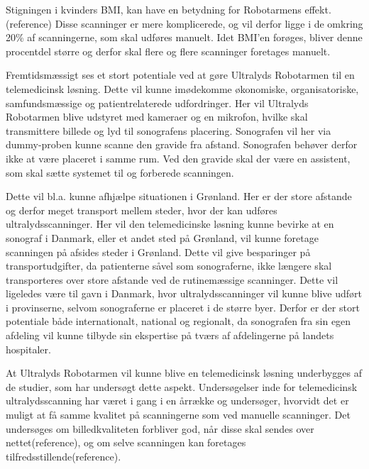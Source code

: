 Stigningen i kvinders BMI, kan have en betydning for Robotarmens effekt. (reference) Disse scanninger er mere komplicerede, og vil derfor ligge i de omkring 20\% af scanningerne, som skal udføres manuelt. Idet BMI’en forøges, bliver denne procentdel større og derfor skal flere og flere scanninger foretages manuelt. 

Fremtidsmæssigt ses et stort potentiale ved at gøre Ultralyds Robotarmen til en telemedicinsk løsning. Dette vil kunne imødekomme økonomiske, organisatoriske, samfundsmæssige og patientrelaterede
udfordringer. Her vil Ultralyds Robotarmen blive udstyret med kameraer og en mikrofon, hvilke skal transmittere billede og lyd til sonografens placering. Sonografen vil her via dummy-proben kunne scanne den gravide fra afstand. Sonografen behøver derfor ikke at være placeret i samme rum. Ved den gravide skal der være en assistent, som skal sætte systemet til og forberede scanningen.
 
Dette vil bl.a. kunne afhjælpe situationen i Grønland. Her er der store afstande og derfor meget transport mellem steder, hvor der kan udføres ultralydsscanninger. Her vil den telemedicinske løsning kunne bevirke at en sonograf i Danmark, eller et andet sted på Grønland, vil kunne foretage scanningen på afsides steder i Grønland. Dette vil give besparinger på transportudgifter, da patienterne såvel som sonograferne, ikke længere skal transporteres over store afstande ved de rutinemæssige scanninger. 
Dette vil ligeledes være til gavn i Danmark, hvor ultralydsscanninger vil kunne blive udført i provinserne, selvom sonograferne er placeret i de større byer.
Derfor er der stort potentiale både internationalt, national og regionalt, da sonografen fra sin egen afdeling vil kunne tilbyde sin ekspertise på tværs af afdelingerne på landets hospitaler. 

At Ultralyds Robotarmen vil kunne blive en telemedicinsk løsning underbygges af de studier, som har undersøgt dette aspekt. Undersøgelser inde for telemedicinsk ultralydsscanning har været i gang i en årrække og undersøger, hvorvidt det er muligt at få samme kvalitet på scanningerne som ved manuelle scanninger. Det undersøges om billedkvaliteten forbliver god, når disse skal sendes over nettet(reference), og om selve scanningen kan foretages tilfredsstillende(reference). 

